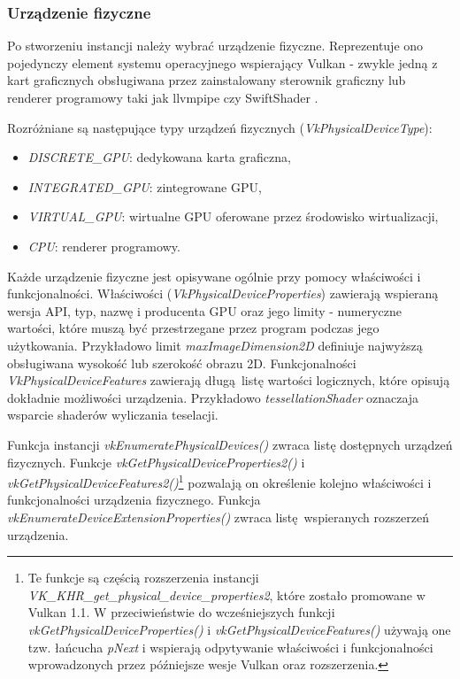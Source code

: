 \subsubsection{Urządzenie fizyczne}

Po stworzeniu instancji należy wybrać urządzenie fizyczne. Reprezentuje ono pojedynczy element systemu operacyjnego wspierający Vulkan - zwykle jedną z kart graficznych obsługiwana przez zainstalowany sterownik graficzny lub renderer programowy taki jak llvmpipe \cite{LLVMPIPE} czy SwiftShader \cite{SWIFTSHADER}.

Rozróżniane są następujące typy urządzeń fizycznych (\textit{VkPhysicalDeviceType}):
\begin{itemize}
	\item \textit{DISCRETE\_GPU}: dedykowana karta graficzna,
	\item \textit{INTEGRATED\_GPU}: zintegrowane GPU,
	\item \textit{VIRTUAL\_GPU}: wirtualne GPU oferowane przez środowisko wirtualizacji,
	\item \textit{CPU}: renderer programowy.
\end{itemize}

Każde urządzenie fizyczne jest opisywane ogólnie przy pomocy właściwości i funkcjonalności.
Właściwości (\textit{VkPhysicalDeviceProperties}) zawierają wspieraną wersja API, typ, nazwę i producenta GPU oraz jego limity - numeryczne wartości, które muszą być przestrzegane przez program podczas jego użytkowania. Przykładowo limit \textit{maxImageDimension2D} definiuje najwyższą obsługiwana wysokość lub szerokość obrazu 2D.
Funkcjonalności \textit{VkPhysicalDeviceFeatures} zawierają długą listę wartości logicznych, które opisują dokładnie możliwości urządzenia. Przykładowo \textit{tessellationShader} oznaczaja wsparcie shaderów wyliczania teselacji.

Funkcja instancji \textit{vkEnumeratePhysicalDevices()} zwraca listę dostępnych urządzeń fizycznych.
Funkcje \textit{vkGetPhysicalDeviceProperties2()} i \textit{vkGetPhysicalDeviceFeatures2()}\footnote{Te funkcje są częścią rozszerzenia instancji \textit{VK\_KHR\_get\_physical\_device\_properties2}, które zostało promowane w Vulkan 1.1. W przeciwieństwie do wcześniejszych funkcji \textit{vkGetPhysicalDeviceProperties()} i \textit{vkGetPhysicalDeviceFeatures()} używają one tzw. łańcucha \textit{pNext} i wspierają odpytywanie właściwości i funkcjonalności wprowadzonych przez późniejsze wesje Vulkan oraz rozszerzenia.} pozwalają on określenie kolejno właściwości i funkcjonalności urządzenia fizycznego.
Funkcja \textit{vkEnumerateDeviceExtensionProperties()} zwraca listę wspieranych rozszerzeń urządzenia.

